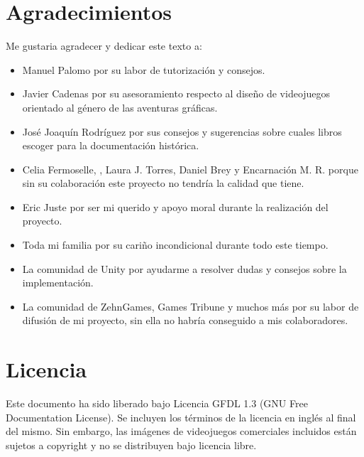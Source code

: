 

\section*{Agradecimientos}

Me gustaria agradecer y dedicar este texto a:
\begin{itemize}
\item Manuel Palomo por su labor de tutorización y consejos.
\item Javier Cadenas por su asesoramiento respecto al diseño de videojuegos orientado al género de las aventuras gráficas.
\item José Joaquín Rodríguez por sus consejos y sugerencias sobre cuales libros escoger para la documentación histórica.
\item Celia Fermoselle, , Laura J. Torres, Daniel Brey y Encarnación M. R. porque sin su colaboración este proyecto no tendría la calidad que tiene. 
\item Eric Juste por ser mi querido  y apoyo moral durante la realización del proyecto.
\item Toda mi familia por su cariño incondicional durante todo este tiempo.
\item La comunidad de Unity por ayudarme a resolver dudas y consejos sobre la implementación.
\item La comunidad de ZehnGames, Games Tribune y muchos más por su labor de difusión de mi proyecto, sin ella no habría conseguido a mis colaboradores.
\end{itemize}

\cleardoublepage

\section*{Licencia} %

Este documento ha sido liberado bajo Licencia GFDL 1.3 (GNU Free
Documentation License). Se incluyen los términos de la licencia en
inglés al final del mismo. Sin embargo, las imágenes de videojuegos comerciales incluidos están sujetos a copyright y no se distribuyen bajo licencia libre.\\

